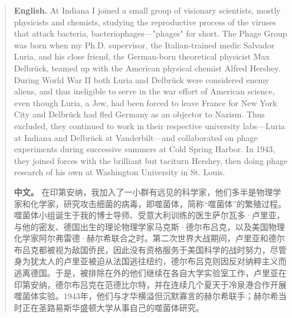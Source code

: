 \begin{quote}
\noindent\textbf{English.} At Indiana I joined a small group of visionary scientists, mostly physicists and chemists, studying the reproductive process of the viruses that attack bacteria, bacteriophages---"phages" for short. The Phage Group was born when my Ph.D. supervisor, the Italian-trained medic Salvador Luria, and his close friend, the German-born theoretical physicist Max Delbrück, teamed up with the American physical chemist Alfred Hershey. During World War II both Luria and Delbrück were considered enemy aliens, and thus ineligible to serve in the war effort of American science, even though Luria, a Jew, had been forced to leave France for New York City and Delbrück had fled Germany as an objector to Nazism. Thus excluded, they continued to work in their respective university labs---Luria at Indiana and Delbrück at Vanderbilt---and collaborated on phage experiments during successive summers at Cold Spring Harbor. In 1943, they joined forces with the brilliant but taciturn Hershey, then doing phage research of his own at Washington University in St. Louis.

\smallskip
\noindent\textbf{中文。} 在印第安纳，我加入了一小群有远见的科学家，他们多半是物理学家和化学家，研究攻击细菌的病毒，即噬菌体，简称“噬菌体”的繁殖过程。噬菌体小组诞生于我的博士导师、受意大利训练的医生萨尔瓦多·卢里亚，与他的密友、德国出生的理论物理学家马克斯·德尔布吕克，以及美国物理化学家阿尔弗雷德·赫尔希联合之时。第二次世界大战期间，卢里亚和德尔布吕克都被视为敌国侨民，因此没有资格服务于美国科学的战时努力，尽管身为犹太人的卢里亚被迫从法国逃往纽约，德尔布吕克则因反对纳粹主义而逃离德国。于是，被排除在外的他们继续在各自大学实验室工作，卢里亚在印第安纳，德尔布吕克在范德比尔特，并在连续几个夏天于冷泉港合作开展噬菌体实验。1943年，他们与才华横溢但沉默寡言的赫尔希联手；赫尔希当时正在圣路易斯华盛顿大学从事自己的噬菌体研究。
\end{quote}

